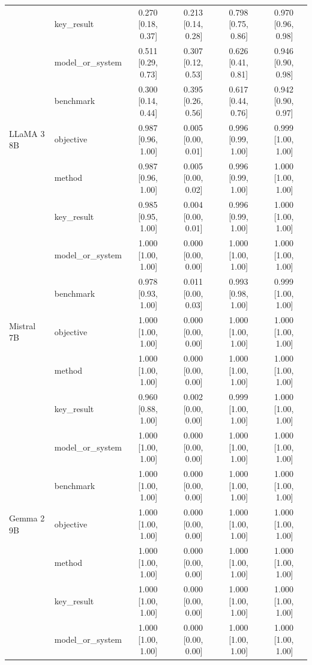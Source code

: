 {\begin{longtable}{@{}p{3.2cm}lcccc@{}}
   & key\_result & 0.270\,[0.18,\,0.37] & 0.213\,[0.14,\,0.28] & 0.798\,[0.75,\,0.86] & 0.970\,[0.96,\,0.98] \\
   & model\_or\_system & 0.511\,[0.29,\,0.73] & 0.307\,[0.12,\,0.53] & 0.626\,[0.41,\,0.81] & 0.946\,[0.90,\,0.98] \\
   & benchmark & 0.300\,[0.14,\,0.44] & 0.395\,[0.26,\,0.56] & 0.617\,[0.44,\,0.76] & 0.942\,[0.90,\,0.97] \\
  \midrule
  LLaMA 3 8B & objective & 0.987\,[0.96,\,1.00] & 0.005\,[0.00,\,0.01] & 0.996\,[0.99,\,1.00] & 0.999\,[1.00,\,1.00] \\
   & method & 0.987\,[0.96,\,1.00] & 0.005\,[0.00,\,0.02] & 0.996\,[0.99,\,1.00] & 1.000\,[1.00,\,1.00] \\
   & key\_result & 0.985\,[0.95,\,1.00] & 0.004\,[0.00,\,0.01] & 0.996\,[0.99,\,1.00] & 1.000\,[1.00,\,1.00] \\
   & model\_or\_system & 1.000\,[1.00,\,1.00] & 0.000\,[0.00,\,0.00] & 1.000\,[1.00,\,1.00] & 1.000\,[1.00,\,1.00] \\
   & benchmark & 0.978\,[0.93,\,1.00] & 0.011\,[0.00,\,0.03] & 0.993\,[0.98,\,1.00] & 0.999\,[1.00,\,1.00] \\
  \midrule
  Mistral 7B & objective & 1.000\,[1.00,\,1.00] & 0.000\,[0.00,\,0.00] & 1.000\,[1.00,\,1.00] & 1.000\,[1.00,\,1.00] \\
   & method & 1.000\,[1.00,\,1.00] & 0.000\,[0.00,\,0.00] & 1.000\,[1.00,\,1.00] & 1.000\,[1.00,\,1.00] \\
   & key\_result & 0.960\,[0.88,\,1.00] & 0.002\,[0.00,\,0.00] & 0.999\,[1.00,\,1.00] & 1.000\,[1.00,\,1.00] \\
   & model\_or\_system & 1.000\,[1.00,\,1.00] & 0.000\,[0.00,\,0.00] & 1.000\,[1.00,\,1.00] & 1.000\,[1.00,\,1.00] \\
   & benchmark & 1.000\,[1.00,\,1.00] & 0.000\,[0.00,\,0.00] & 1.000\,[1.00,\,1.00] & 1.000\,[1.00,\,1.00] \\
  \midrule
  Gemma 2 9B & objective & 1.000\,[1.00,\,1.00] & 0.000\,[0.00,\,0.00] & 1.000\,[1.00,\,1.00] & 1.000\,[1.00,\,1.00] \\
   & method & 1.000\,[1.00,\,1.00] & 0.000\,[0.00,\,0.00] & 1.000\,[1.00,\,1.00] & 1.000\,[1.00,\,1.00] \\
   & key\_result & 1.000\,[1.00,\,1.00] & 0.000\,[0.00,\,0.00] & 1.000\,[1.00,\,1.00] & 1.000\,[1.00,\,1.00] \\
   & model\_or\_system & 1.000\,[1.00,\,1.00] & 0.000\,[0.00,\,0.00] & 1.000\,[1.00,\,1.00] & 1.000\,[1.00,\,1.00] \\

\end{longtable}}
